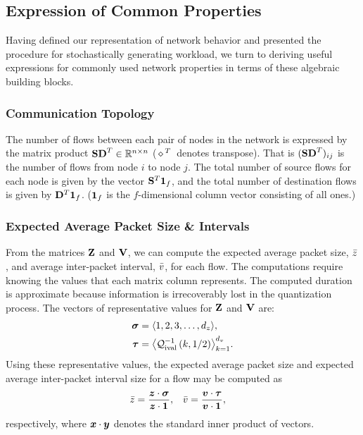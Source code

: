 \documentclass[twocolumn,final]{svjour3}
\begin{document}
\subsection{Expression of Common Properties}
\label{sec:common-properties}

Having defined our representation of network behavior and presented the procedure for stochastically generating workload, we turn to deriving useful expressions for commonly used network properties in terms of these algebraic building blocks.

\subsubsection{Communication Topology}
\label{sec:communication-topology}

The number of flows between each pair of nodes in the network is expressed by the matrix product ${\mathbf{SD}}^T\in\mathbb{R}^{n \times n}$ (${\,\diamond\,}^T$~denotes transpose). That is $({\mathbf{SD}}^T)_{ij}$ is the number of flows from node $i$ to node $j$. The total number of source flows for each node is given by the vector ${\mathbf{S}}^T\mathbf{1}_{f}$, and the total number of destination flows is given by ${\mathbf{D}}^T\mathbf{1}_{f}$. ($\mathbf{1}_{f}$ is the $f$-dimensional column vector consisting of all ones.)

\subsubsection{Expected Average Packet Size \& Intervals}
\label{sec:flow-totals}

From the matrices $\mathbf{Z}$ and $\mathbf{V}$, we can compute the expected average packet size, $\bar{z}$, and average inter-packet interval, $\bar{v}$, for each flow.
The computations require knowing the values that each matrix column represents.
The computed duration is approximate because information is irrecoverably lost in the quantization process.
The vectors of representative values for $\mathbf{Z}$ and $\mathbf{V}$ are:
\begin{align}
\vec{\sigma}&=\tuple{1,2,3,\dots,d_z},\\
\vec{\tau}&=\tuple{\Di\left(k,\fracx{1}{2}\right)}_{k=1}^{d_v}.
\end{align}
Using these representative values, the expected average packet size and expected average inter-packet interval size for a flow may be computed as
\begin{align}
  \mean{z}&=\frac{\inner{\vec{z}}{\vec{\sigma}}}{\inner{\vec{z}}{\ones{}}}, &
  \mean{v}&=\frac{\inner{\vec{v}}{\vec{\tau}}}{\inner{\vec{v}}{\ones{}}},
\end{align}
respectively, where $\inner{\vec{x}}{\vec{y}}$ denotes the standard inner product of vectors.
\end{document}
